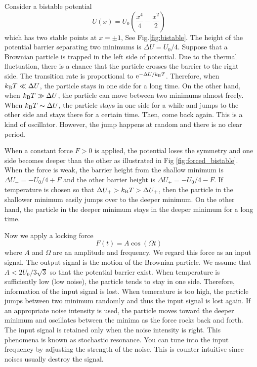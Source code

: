 Consider a bistable potential
\begin{equation}
U(x) = U_0 \left ( \frac{x^4}{4} - \frac{x^2}{2} \right )
\end{equation}
which has two stable points at $x=\pm 1$, See Fig.\ref{fig:bistable}. The height of the potential barrier separating two minimums is
$\Delta U = U_0/4$. Suppose that a Brownian particle is trapped in the left side of potential.  Due to the thermal fluctuation, there is a chance that the particle crosses the barrier to the right side.  The transition rate is proportional to $\text{e}^{-\Delta U/k_\text{B} T}$. Therefore, when $k_\text{B} T \ll \Delta U$, the particle stays in one side for a long time.  On the other hand, when $k_\text{B} T \gg \Delta U$, the particle can move between two minimums almost freely.  When $k_\text{B} T \sim \Delta U$, the particle stays in one side for a while and jumps to the other side and stays there for a certain time. Then, come back again.  This is a kind of oscillator.  However, the jump happens at random and there is no clear period.

When a constant force $F>0$ is applied, the potential loses the symmetry and one side becomes deeper than the other as illustrated in Fig \ref{fig:forced_bistable}.  When the force is weak, the barrier height from the shallow minimum is $\Delta U_- = -U_0/4+F$ and the other barrier height is $\Delta U_+ = -U_0/4-F$.  If temperature is chosen so that $\Delta U_+ > k_\text{B} T > \Delta U_+$, then the particle in the shallower minimum easily jumps over to the deeper minimum.  On the  other hand, the particle in the deeper minimum stays in the deeper minimum for a long time.

Now we apply a locking force
\begin{equation}
F(t) = A \cos(\Omega t)
\end{equation}
where $A$ and $\Omega$ are an amplitude and frequency.  We regard this force as an input signal.  The output signal is the motion of the Brownian particle.   We assume that $A < 2 U_0 /3 \sqrt{3}$ so that the potential barrier exist.  When temperature is sufficiently low (low noise), the particle tends to stay in one side. Therefore, information of the input signal is lost.  When temerature is too high, the particle jumps between two minimum randomly and thus the input signal is lost again.   If an appropriate noise intensity is used, the particle moves toward the deeper minimum and oscillates between the minima as the force rocks back and forth.  The input signal is retained only when the noise intensity is right.  This phenomena is known as stochastic resonance.  You can tune into the input frequency by adjusting the strength of the noise.  This is counter intuitive since noises usually destroy the signal.


